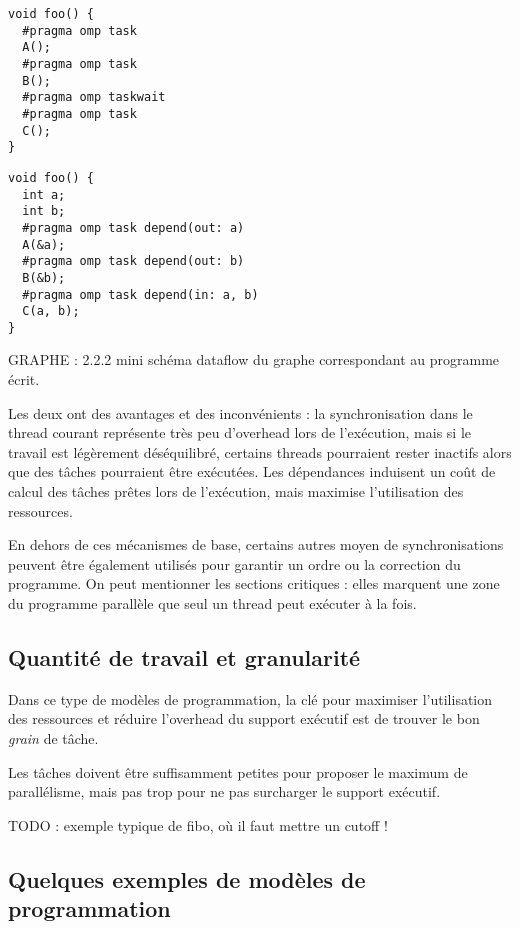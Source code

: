 \begin{lstlisting}[caption=Synchronisation dans le thread courant (OpenMP),label=lst:context:task-wait]
void foo() {
  #pragma omp task
  A();
  #pragma omp task
  B();
  #pragma omp taskwait
  #pragma omp task
  C();
}
\end{lstlisting}

\begin{lstlisting}[caption=Synchronisation via des dépendances (OpenMP),label=lst:context:task-dep]
void foo() {
  int a;
  int b;
  #pragma omp task depend(out: a)
  A(&a);
  #pragma omp task depend(out: b)
  B(&b);
  #pragma omp task depend(in: a, b)
  C(a, b);
}
\end{lstlisting}

GRAPHE : 2.2.2 mini schéma dataflow du graphe correspondant au programme écrit.

Les deux ont des avantages et des inconvénients : la synchronisation dans le thread courant représente très peu d'overhead lors de l'exécution, mais si le travail est légèrement déséquilibré, certains threads pourraient rester inactifs alors que des tâches pourraient être exécutées.
Les dépendances induisent un coût de calcul des tâches prêtes lors de l'exécution, mais maximise l'utilisation des ressources.

En dehors de ces mécanismes de base, certains autres moyen de synchronisations peuvent être également utilisés pour garantir un ordre ou la correction du programme.
On peut mentionner les sections critiques : elles marquent une zone du programme parallèle que seul un thread peut exécuter à la fois.


\subsection{Quantité de travail et granularité}

Dans ce type de modèles de programmation, la clé pour maximiser l'utilisation des ressources et réduire l'overhead du support exécutif est de trouver le bon \emph{grain} de tâche.

Les tâches doivent être suffisamment petites pour proposer le maximum de parallélisme, mais pas trop pour ne pas surcharger le support exécutif.

TODO : exemple typique de fibo, où il faut mettre un cutoff !


\subsection{Quelques exemples de modèles de programmation}

